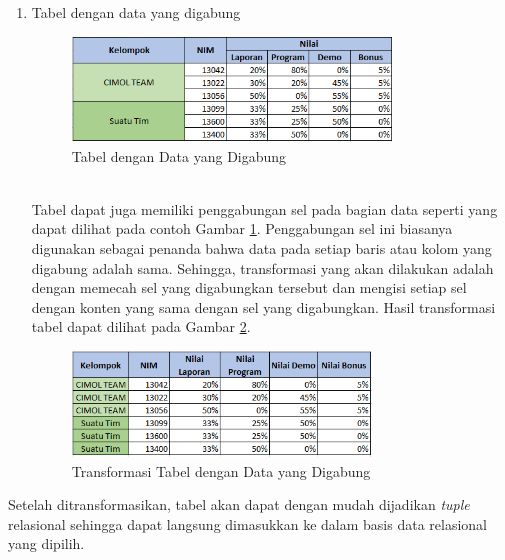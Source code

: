 \begin{enumerate}
	\item Tabel dengan data yang digabung
	\begin{figure}[htbp]
	    \centering
	    \includegraphics[width=0.8\textwidth]{resources/chapter-3-tabletype-4.png}
	    \caption{Tabel dengan Data yang Digabung}
		\label{TabelTipe4}
	\end{figure}\\
	Tabel dapat juga memiliki penggabungan sel pada bagian data seperti yang dapat dilihat pada contoh Gambar \ref{TabelTipe4}. Penggabungan sel ini biasanya digunakan sebagai penanda bahwa data pada setiap baris atau kolom yang digabung adalah sama. Sehingga, transformasi yang akan dilakukan adalah dengan memecah sel yang digabungkan tersebut dan mengisi setiap sel dengan konten yang sama dengan sel yang digabungkan. Hasil transformasi tabel dapat dilihat pada Gambar \ref{TabelTipe4T}.\\
	\begin{figure}[htbp]
	    \centering
	    \includegraphics[width=0.75\textwidth]{resources/chapter-3-tabletype-4-transformed.png}
	    \caption{Transformasi Tabel dengan Data yang Digabung}
		\label{TabelTipe4T}
	\end{figure}
\end{enumerate}
Setelah ditransformasikan, tabel akan dapat dengan mudah dijadikan \textit{tuple} relasional sehingga dapat langsung dimasukkan ke dalam basis data relasional yang dipilih.

